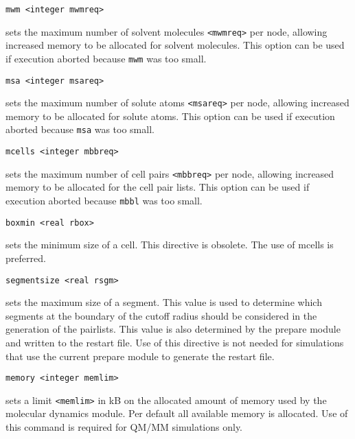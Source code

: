 \begin{description}
\item
\begin{verbatim}
mwm <integer mwmreq>
\end{verbatim}
sets the maximum number of solvent molecules \verb+<mwmreq>+ per node,
allowing increased memory to be allocated for solvent molecules. This
option can be used if execution aborted because \verb+mwm+ was too
small.

\item
\begin{verbatim}
msa <integer msareq>
\end{verbatim}
sets the maximum number of solute atoms \verb+<msareq>+ per node,
allowing increased memory to be allocated for solute atoms. This
option can be used if execution aborted because \verb+msa+ was too
small.

\item
\begin{verbatim}
mcells <integer mbbreq>
\end{verbatim}
sets the maximum number of cell pairs \verb+<mbbreq>+ per node,
allowing increased memory to be allocated for the cell pair lists. 
This option can be used if execution aborted because \verb+mbbl+ was too
small.

\item
\begin{verbatim}
boxmin <real rbox>
\end{verbatim}
sets the minimum size of a cell. This directive is obsolete. The
use of mcells is preferred.

\item
\begin{verbatim}
segmentsize <real rsgm>
\end{verbatim}
sets the maximum size of a segment. This value is used to determine
which segments at the boundary of the cutoff radius should be considered
in the generation of the pairlists. This value is also determined by the
prepare module and written to the restart file. Use of this directive
is not needed for simulations that use the current prepare module to
generate the restart file.

\item
\begin{verbatim}
memory <integer memlim>
\end{verbatim}
sets a limit \verb+<memlim>+ in kB on the allocated amount of memory used by 
the molecular dynamics module.
Per default all available memory is allocated. Use of this command
is required for QM/MM simulations only.


\end{description}
